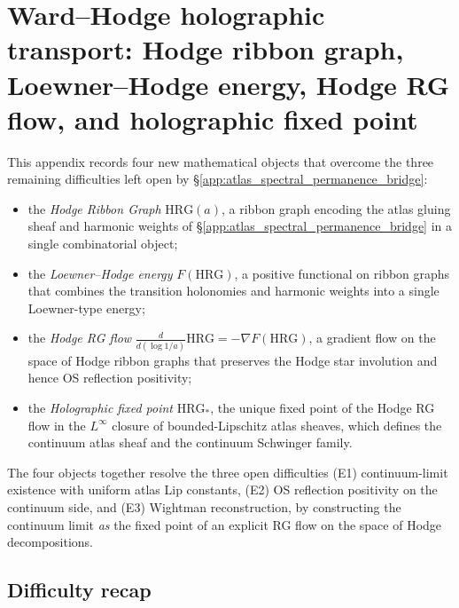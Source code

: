 \section{Ward--Hodge holographic transport: Hodge ribbon graph, Loewner--Hodge energy, Hodge RG flow, and holographic fixed point}
\label{app:ward_hodge_holographic_transport}

This appendix records four new mathematical objects that overcome the
three remaining difficulties left open by
\S\ref{app:atlas_spectral_permanence_bridge}:
\begin{itemize}
\item the \emph{Hodge Ribbon Graph} $\mathrm{HRG}(a)$, a ribbon graph
  encoding the atlas gluing sheaf and harmonic weights of
  \S\ref{app:atlas_spectral_permanence_bridge} in a single combinatorial
  object;
\item the \emph{Loewner--Hodge energy} $F(\mathrm{HRG})$, a positive
  functional on ribbon graphs that combines the transition holonomies
  and harmonic weights into a single Loewner-type energy;
\item the \emph{Hodge RG flow}
  $\frac{d}{d(\log 1/a)}\mathrm{HRG}=-\nabla F(\mathrm{HRG})$, a
  gradient flow on the space of Hodge ribbon graphs that preserves the
  Hodge star involution and hence OS reflection positivity;
\item the \emph{Holographic fixed point} $\mathrm{HRG}_{*}$, the unique
  fixed point of the Hodge RG flow in the $L^{\infty}$ closure of
  bounded-Lipschitz atlas sheaves, which defines the continuum atlas
  sheaf and the continuum Schwinger family.
\end{itemize}
The four objects together resolve the three open difficulties
(E1) continuum-limit existence with uniform atlas Lip constants,
(E2) OS reflection positivity on the continuum side, and
(E3) Wightman reconstruction, by constructing the continuum limit
\emph{as} the fixed point of an explicit RG flow on the space of Hodge
decompositions.

\subsection{Difficulty recap}
\label{ssec:whht_difficulty_recap}

